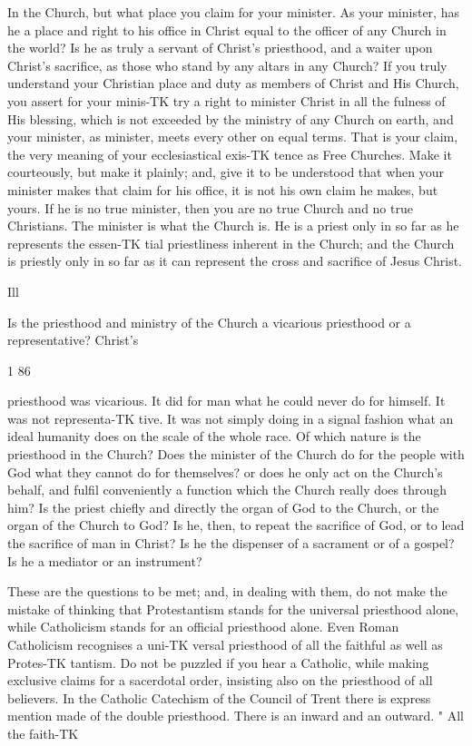 \documentclass[12pt,a5paper,oneside]{book}
\begin{document}
{In the Church, but what place you claim for your 
minister. As your minister, has he a place and right 
to his office in Christ equal to the officer of any Church 
in the world? Is he as truly a servant of Christ's 
priesthood, and a waiter upon Christ's sacrifice, as those 
who stand by any altars in any Church? If you truly 
understand your Christian place and duty as members 
of Christ and His Church, you assert for your minis-TK
try a right to minister Christ in all the fulness of 
His blessing, which is not exceeded by the ministry 
of any Church on earth, and your minister, as minister, 
meets every other on equal terms. That is your 
claim, the very meaning of your ecclesiastical exis-TK
tence as Free Churches. Make it courteously, but 
make it plainly; and, give it to be understood that 
when your minister makes that claim for his office, it 
is not his own claim he makes, but yours. If he is 
no true minister, then you are no true Church and no 
true Christians. The minister is what the Church is. 
He is a priest only in so far as he represents the essen-TK
tial priestliness inherent in the Church; and the 
Church is priestly only in so far as it can represent 
the cross and sacrifice of Jesus Christ. 

Ill 

Is the priesthood and ministry of the Church a 
vicarious priesthood or a representative? Christ's 



1 86 

priesthood was vicarious. It did for man what he 
could never do for himself. It was not representa-TK
tive. It was not simply doing in a signal fashion what 
an ideal humanity does on the scale of the whole race. 
Of which nature is the priesthood in the Church? 
Does the minister of the Church do for the people 
with God what they cannot do for themselves? or 
does he only act on the Church's behalf, and fulfil 
conveniently a function which the Church really does 
through him? Is the priest chiefly and directly the 
organ of God to the Church, or the organ of the 
Church to God? Is he, then, to repeat the sacrifice 
of God, or to lead the sacrifice of man in Christ? Is 
he the dispenser of a sacrament or of a gospel? Is 
he a mediator or an instrument? 

These are the questions to be met; and, in dealing 
with them, do not make the mistake of thinking that 
Protestantism stands for the universal priesthood alone, 
while Catholicism stands for an official priesthood 
alone. Even Roman Catholicism recognises a uni-TK
versal priesthood of all the faithful as well as Protes-TK
tantism. Do not be puzzled if you hear a Catholic, 
while making exclusive claims for a sacerdotal order, 
insisting also on the priesthood of all believers. In 
the Catholic Catechism of the Council of Trent there 
is express mention made of the double priesthood. 
There is an inward and an outward. " All the faith-TK



}
\end{document}
